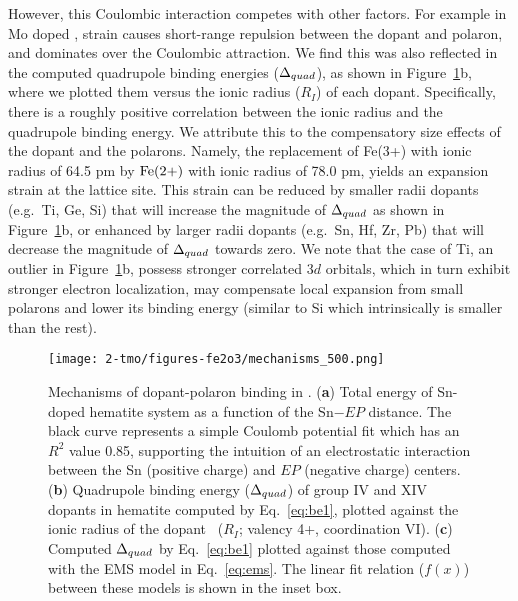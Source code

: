 However, this Coulombic interaction competes with other factors. For example
in Mo doped \cite{wu2018combining}, strain causes short-range repulsion between the dopant and polaron, and dominates over the Coulombic attraction.\cite{wu2018combining,zhang2018unconventional}
We find this was also reflected in the computed quadrupole binding energies ($\Delta_{quad}$), as shown in Figure~\ref{fig:mechanisms}b, where we plotted them versus the ionic radius ($R_I$) of each dopant.
Specifically, there is a roughly positive correlation between the ionic radius and the quadrupole binding energy. We attribute this to the compensatory size effects of the dopant and the polarons. Namely, the replacement of Fe(3+) with ionic radius of 64.5 pm by $\rm Fe (2+)$ with ionic radius of 78.0 pm, yields an expansion strain at the lattice site. This strain can be reduced by smaller radii dopants (e.g.\ Ti, Ge, Si) that will increase the magnitude of $\Delta_{quad}$ as shown in Figure~\ref{fig:mechanisms}b, or enhanced by larger radii dopants (e.g.\ Sn, Hf, Zr, Pb) that will decrease the magnitude of $\Delta_{quad}$ towards zero.
We note that the case of Ti, an outlier in Figure~\ref{fig:mechanisms}b, possess stronger correlated $3d$ orbitals, which in turn exhibit stronger electron localization, may compensate local expansion from small polarons  and lower its binding energy (similar to Si which intrinsically is smaller than the rest).

\begin{figure}[H]
    \centering
    \texttt{[image: 2-tmo/figures-fe2o3/mechanisms\_500.png]} %
    \caption{
    Mechanisms of dopant-polaron binding in .
    (\textbf{a}) Total energy of Sn-doped hematite system as a function of the Sn$-EP$ distance.
    The black curve represents a simple Coulomb potential fit which has an $R^2$ value 0.85, supporting the intuition of an electrostatic interaction between the Sn (positive charge) and $EP$ (negative charge) centers.
    (\textbf{b}) Quadrupole binding energy ($\Delta_{quad}$) of group IV and XIV dopants in hematite computed by Eq.~\ref{eq:be1}, plotted against the ionic radius of the dopant~\cite{shannon1976revised} ($R_I$; valency 4+, coordination VI).
    (\textbf{c}) Computed $\Delta_{quad}$ by Eq.~\ref{eq:be1} plotted against those computed with the EMS model in Eq.~\ref{eq:ems}. The linear fit relation ($f(x)$) between these models is shown in the inset box.
    }
    \label{fig:mechanisms}
\end{figure}


